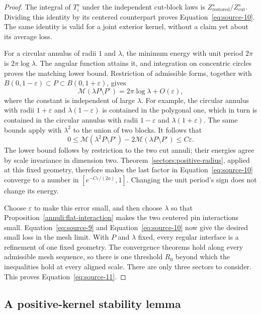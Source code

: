 \begin{proof}
The integral of \(T_i^s\) under the independent cut-block laws is
\(Z_{\mathrm{restored}}^s/Z_{\mathrm{cut}}^s\). Dividing this
identity by its centered counterpart proves
Equation~\eqref{eq:source-10}. The same identity is valid for a
joint exterior kernel, without a claim yet about its average loss.

For a circular annulus of radii \(1\) and \(\lambda\), the minimum
energy with unit period \(2\pi\) is \(2\pi\log\lambda\).
The angular function attains it, and integration on concentric
circles proves the matching lower bound. Restriction of admissible
forms, together with
\(B(0,1-\varepsilon)\subset P\subset B(0,1+\varepsilon)\), gives
\[
 \mathcal M(\lambda P\setminus P^\circ)
       =2\pi\log\lambda+O(\varepsilon),
\]
where the constant is independent of large \(\lambda\). For example,
the circular annulus with radii \(1+\varepsilon\) and
\(\lambda(1-\varepsilon)\) is contained in the polygonal one,
which in turn is contained in the circular annulus with radii
\(1-\varepsilon\) and \(\lambda(1+\varepsilon)\).
The same bounds apply with \(\lambda^2\) to the union of two blocks.
It follows that
\[
 0\le
 \mathcal M(\lambda^2P\setminus P^\circ)
       -2\mathcal M(\lambda P\setminus P^\circ)
 \le C\varepsilon.
\]
The lower bound follows by restriction to the two cut annuli;
their energies agree by scale invariance in dimension two.
Theorem~\ref{sectors:positive-radius}, applied at this fixed geometry,
therefore makes the last factor in Equation~\eqref{eq:source-10}
converge to a number in \([e^{-C\varepsilon/(2a)},1]\).
Changing the unit period's sign does not change its energy.

Choose \(\varepsilon\) to make this error small, and then choose
\(\lambda\) so that Proposition~\ref{annuli:flat-interaction} makes
the two centered pin interactions small.
Equation~\eqref{eq:source-9} and
Equation~\eqref{eq:source-10} now give the desired small loss in
the mesh limit. With \(P\) and \(\lambda\) fixed, every regular
interface is a refinement of one fixed geometry. The convergence
theorems hold along every admissible mesh sequence, so there is
one threshold \(R_0\) beyond which the inequalities hold at every
aligned scale. There are only three sectors to consider.
This proves Equation~\eqref{eq:source-11}.
\end{proof}

\subsection{A positive-kernel stability lemma}

